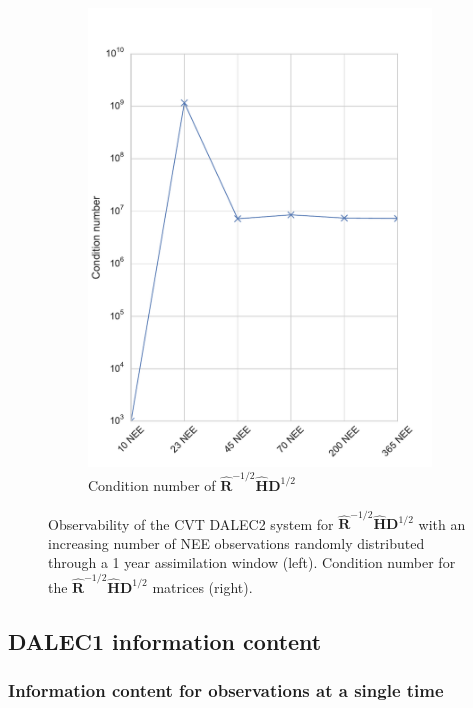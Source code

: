 \documentclass[11pt]{article}
\begin{document}
\begin{figure}[ht]
\begin{subfigure}[b]{0.4\textwidth}
        \includegraphics[width=\textwidth]{dalec2_obsrankcondcvtwind.pdf}
        \caption{Condition number of $\hat{\textbf{R}}^{-1/2}\hat{\textbf{H}}\textbf{D}^{1/2}$}
        \label{fig:D2_observabilitycondcvtwind}
    \end{subfigure}
    \caption{Observability of the CVT DALEC2 system for $\hat{\textbf{R}}^{-1/2}\hat{\textbf{H}}\textbf{D}^{1/2}$ with an increasing number of NEE observations randomly distributed through a 1 year assimilation window (left). Condition number for the $\hat{\textbf{R}}^{-1/2}\hat{\textbf{H}}\textbf{D}^{1/2}$ matrices (right).}
    \label{fig:D2_cvtobservabilitywind}
\end{figure}


\subsection{DALEC1 information content} \label{sec:D1_IC} %
\subsubsection{Information content for observations at a single time} \label{sec:info_con_single_time}
\end{document}
